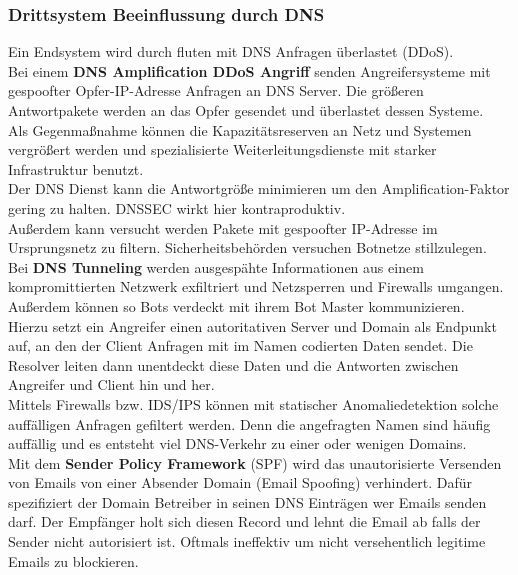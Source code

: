 \documentclass[a4paper,12pt,leqno]{article}
\begin{document}
\subsubsection{Drittsystem Beeinflussung durch DNS}

Ein Endsystem wird durch fluten mit DNS Anfragen überlastet (DDoS).\\
Bei einem \textbf{DNS Amplification DDoS Angriff} senden Angreifersysteme mit gespoofter Opfer-IP-Adresse Anfragen an DNS Server. Die größeren Antwortpakete werden an das Opfer gesendet und überlastet dessen Systeme.\\
Als Gegenmaßnahme können die Kapazitätsreserven an Netz und Systemen vergrößert werden und spezialisierte Weiterleitungsdienste mit starker Infrastruktur benutzt.\\
Der DNS Dienst kann die Antwortgröße minimieren um den Amplification-Faktor gering zu halten. DNSSEC wirkt hier kontraproduktiv.\\
Außerdem kann versucht werden Pakete mit gespoofter IP-Adresse im Ursprungsnetz zu filtern. Sicherheitsbehörden versuchen Botnetze stillzulegen.\\

Bei \textbf{DNS Tunneling} werden ausgespähte Informationen aus einem kompromittierten Netzwerk exfiltriert und Netzsperren und Firewalls umgangen. Außerdem können so Bots verdeckt mit ihrem Bot Master kommunizieren.\\
Hierzu setzt ein Angreifer einen autoritativen Server und Domain als Endpunkt auf, an den der Client Anfragen mit im Namen codierten Daten sendet. Die Resolver leiten dann unentdeckt diese Daten und die Antworten zwischen Angreifer und Client hin und her.\\
Mittels Firewalls bzw. IDS/IPS können mit statischer Anomaliedetektion solche auffälligen Anfragen gefiltert werden. Denn die angefragten Namen sind häufig auffällig und es entsteht viel DNS-Verkehr zu einer oder wenigen Domains.\\

Mit dem \textbf{Sender Policy Framework} (SPF) wird das unautorisierte Versenden von Emails von einer Absender Domain (Email Spoofing) verhindert. Dafür spezifiziert der Domain Betreiber in seinen DNS Einträgen wer Emails senden darf. Der Empfänger holt sich diesen Record und lehnt die Email ab falls der Sender nicht autorisiert ist. Oftmals ineffektiv um nicht versehentlich legitime Emails zu blockieren.
\end{document}
